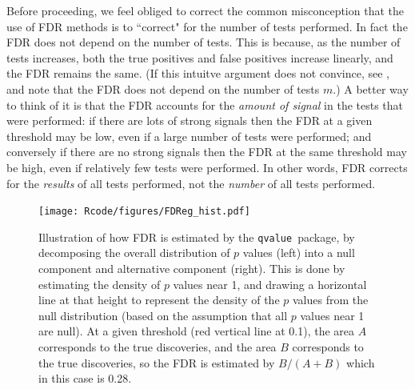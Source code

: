 \documentclass[11pt]{article}
\def\qvalue{{\tt qvalue}\xspace}
\def\locfdr{{\tt locfdr}\xspace}
\begin{document}

  
  
 Before proceeding, we feel obliged to correct the common misconception
 that the use of FDR methods is to ``correct" for the number of tests performed. In fact the FDR does
 not depend on the number of tests. This is because, as the number of tests increases, both the true positives and false positives increase linearly,
 and the FDR remains the same. (If this intuitve argument does not convince, see \cite{storey.xx}, and note that the FDR does not depend on the number of tests $m$.)
  A better way to think of it is that the FDR accounts for the {\it amount of signal} in the tests that were performed: 
 if there are lots of strong signals then the FDR at a given threshold may be low, even if a large number of tests were performed; and conversely
 if there are no strong signals then the FDR at the same threshold may be high, even if relatively few tests were performed. 
 In other words, FDR corrects for the {\it results} of all tests performed, not the {\it number} of all tests performed.
 

\begin{figure}
\texttt{[image: Rcode/figures/FDReg\_hist.pdf]}
\caption{Illustration of how FDR is estimated by the \qvalue \, package, by decomposing the overall distribution of $p$ values (left) into a null component and alternative component (right). This is done by estimating the density of $p$ values near 1, and drawing a horizontal line at that height to represent the density of the $p$ values from the null distribution (based on the assumption that all $p$ values near 1 are null).
At a given threshold (red vertical line at 0.1), the area $A$ corresponds to the true discoveries, and the area $B$ corresponds to the true discoveries,
so the FDR is estimated by $B/(A+B)$ which in this case is 0.28.} \label{fig:qvalue}
\end{figure}
\end{document}
